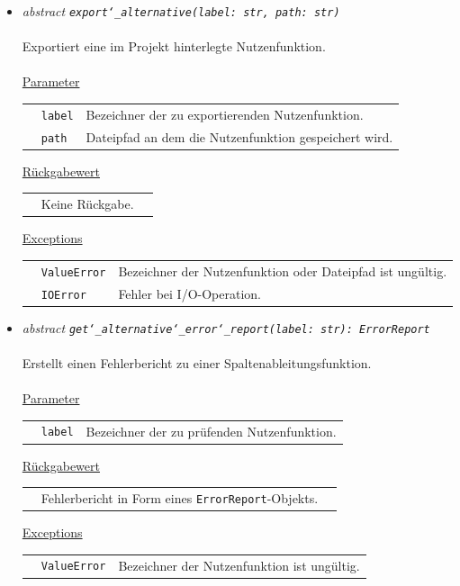 \documentclass{article}
\begin{document}
\begin{itemize}
\item \textit{\flqq{}abstract\frqq} \texttt{\textit{export\char`_alternative(label: str, path: str)}}\\\\
Exportiert eine im Projekt hinterlegte Nutzenfunktion.
\\\\
\underline{Parameter}\\
\begin{tabular}{lll}
 & \texttt{label} & Bezeichner der zu exportierenden Nutzenfunktion.\\
 & \texttt{path} & Dateipfad an dem die Nutzenfunktion gespeichert wird.\\
\end{tabular}

\underline{Rückgabewert}\\
\begin{tabular}{lll}
 & Keine Rückgabe.\\
\end{tabular}

\underline{Exceptions}\\
\begin{tabular}{lll}
 & \texttt{ValueError} & Bezeichner der Nutzenfunktion oder Dateipfad ist ungültig.\\
 & \texttt{IOError} & Fehler bei I/O-Operation.\\
\end{tabular}


\item \textit{\flqq{}abstract\frqq} \texttt{\textit{get\char`_alternative\char`_error\char`_report(label: str): ErrorReport}}\\\\
Erstellt einen Fehlerbericht zu einer Spaltenableitungsfunktion.
\\\\
\underline{Parameter}\\
\begin{tabular}{lll}
 & \texttt{label} & Bezeichner der zu prüfenden Nutzenfunktion.\\
\end{tabular}

\underline{Rückgabewert}\\
\begin{tabular}{lll}
 & Fehlerbericht in Form eines \texttt{ErrorReport}-Objekts.\\
\end{tabular}

\underline{Exceptions}\\
\begin{tabular}{lll}
 & \texttt{ValueError} & Bezeichner der Nutzenfunktion ist ungültig.\\
\end{tabular}



\end{itemize}
\end{document}
